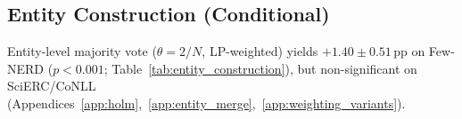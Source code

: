 \subsection{Entity Construction (Conditional)}\label{sec:prescriptive}

Entity-level majority vote ($\theta{=}2/N$, LP-weighted) yields $+1.40{\pm}0.51$\,pp on Few-NERD ($p{<}0.001$; Table~\ref{tab:entity_construction}), but non-significant on SciERC/CoNLL (Appendices~\ref{app:holm},~\ref{app:entity_merge},~\ref{app:weighting_variants}).

\label{sec:selection_results}
